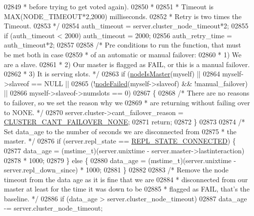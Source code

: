 \begin{DoxyCode}
{{{{{{{{{{{{{{{{{{{{{{{{{{{{{{{{{{{{{{{{{{{{{{{{{{{02849 \textcolor{comment}{     * before trying to get voted again).}
02850 \textcolor{comment}{     *}
02851 \textcolor{comment}{     * Timeout is MAX(NODE\_TIMEOUT*2,2000) milliseconds.}
02852 \textcolor{comment}{     * Retry is two times the Timeout.}
02853 \textcolor{comment}{     */}
02854     auth\_timeout = server.cluster\_node\_timeout*2;
02855     \textcolor{keywordflow}{if} (auth\_timeout < 2000) auth\_timeout = 2000;
02856     auth\_retry\_time = auth\_timeout*2;
02857 
02858     \textcolor{comment}{/* Pre conditions to run the function, that must be met both in case}
02859 \textcolor{comment}{     * of an automatic or manual failover:}
02860 \textcolor{comment}{     * 1) We are a slave.}
02861 \textcolor{comment}{     * 2) Our master is flagged as FAIL, or this is a manual failover.}
02862 \textcolor{comment}{     * 3) It is serving slots. */}
02863     \textcolor{keywordflow}{if} (\hyperlink{cluster_8h_a2d8e84269474d8750565fb3fb67aa436}{nodeIsMaster}(myself) ||
02864         myself->slaveof == NULL ||
02865         (!\hyperlink{cluster_8h_a6a31c614ff4f5ac8ebaa630b0a921c3d}{nodeFailed}(myself->slaveof) && !manual\_failover) ||
02866         myself->slaveof->numslots == 0)
02867     \{
02868         \textcolor{comment}{/* There are no reasons to failover, so we set the reason why we}
02869 \textcolor{comment}{         * are returning without failing over to NONE. */}
02870         server.cluster->cant\_failover\_reason = \hyperlink{cluster_8h_a9a55c4c18a5113bc3c8272f62a983c96}{CLUSTER\_CANT\_FAILOVER\_NONE};
02871         \textcolor{keywordflow}{return};
02872     \}
02873 
02874     \textcolor{comment}{/* Set data\_age to the number of seconds we are disconnected from}
02875 \textcolor{comment}{     * the master. */}
02876     \textcolor{keywordflow}{if} (server.repl\_state == \hyperlink{server_8h_aed693b3a9cdfc05cf5ab7551a8c86fbe}{REPL\_STATE\_CONNECTED}) \{
02877         data\_age = (mstime\_t)(server.unixtime - server.master->lastinteraction)
02878                    * 1000;
02879     \} \textcolor{keywordflow}{else} \{
02880         data\_age = (mstime\_t)(server.unixtime - server.repl\_down\_since) * 1000;
02881     \}
02882 
02883     \textcolor{comment}{/* Remove the node timeout from the data age as it is fine that we are}
02884 \textcolor{comment}{     * disconnected from our master at least for the time it was down to be}
02885 \textcolor{comment}{     * flagged as FAIL, that's the baseline. */}
02886     \textcolor{keywordflow}{if} (data\_age > server.cluster\_node\_timeout)
02887         data\_age -= server.cluster\_node\_timeout;
}}}}}}}}}}}}}}}}}}}}}}}}}}}}}}}}}}}}}}}}}}}}}}}}}}}
\end{DoxyCode}
